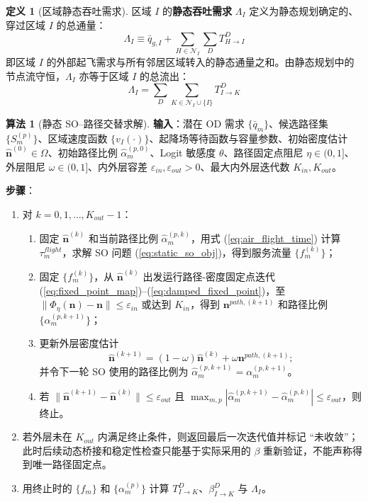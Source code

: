 \documentclass[a4paper,12pt]{article}
\theoremstyle{plain}
\theoremstyle{definition}
\newtheorem{definition}[theorem]{定义}
\newtheorem{algorithm}[theorem]{算法}
\theoremstyle{remark}
\begin{document}
\begin{definition}[区域静态吞吐需求]\label{def:lambda}
区域 $I$ 的\textbf{静态吞吐需求} $\Lambda_I$ 定义为静态规划确定的、穿过区域 $I$ 的总通量：
\begin{equation}\label{eq:lambda_def}
    \Lambda_I \equiv \bar{q}_{g,I} + \sum_{H \in \mathcal{N}_I} \sum_D T_{H \to I}^D
\end{equation}
即区域 $I$ 的外部起飞需求与所有邻居区域转入的静态通量之和。由静态规划中的节点流守恒，$\Lambda_I$ 亦等于区域 $I$ 的总流出：
\begin{equation}\label{eq:lambda_outflow}
    \Lambda_I = \sum_D \sum_{K \in \mathcal{N}_I \cup \{I\}} T_{I \to K}^D
\end{equation}
\end{definition}

\begin{algorithm}[静态 SO--路径交替求解]\label{alg:static_path_coupling}
\textbf{输入}：潜在 OD 需求 $\{\bar q_m\}$、候选路径集 $\{S_m^{(p)}\}$、区域速度函数 $\{v_I(\cdot)\}$、起降场等待函数与容量参数、初始密度估计 $\hat{\bm n}^{(0)}\in\Omega$、初始路径比例 $\widehat\alpha_m^{(p,0)}$、Logit 敏感度 $\theta$、路径固定点阻尼 $\eta\in(0,1]$、外层阻尼 $\omega\in(0,1]$、内外层容差 $\varepsilon_{in},\varepsilon_{out}>0$、最大内外层迭代数 $K_{in},K_{out}$。

\textbf{步骤}：
\begin{enumerate}
    \item 对 $k=0,1,\ldots,K_{out}-1$：
    \begin{enumerate}
        \item 固定 $\hat{\bm n}^{(k)}$ 和当前路径比例 $\widehat\alpha_m^{(p,k)}$，用式 (\ref{eq:air_flight_time}) 计算 $\tau_m^{flight}$，求解 SO 问题 (\ref{eq:static_so_obj})，得到服务流量 $\{f_m^{(k)}\}$；
        \item 固定 $\{f_m^{(k)}\}$，从 $\hat{\bm n}^{(k)}$ 出发运行路径-密度固定点迭代 (\ref{eq:fixed_point_map})--(\ref{eq:damped_fixed_point})，至 $\|\Phi_\eta(\bm n)-\bm n\|\le\varepsilon_{in}$ 或达到 $K_{in}$，得到 $\bm n^{path,(k+1)}$ 和路径比例 $\{\alpha_m^{(p,k+1)}\}$；
        \item 更新外层密度估计
        \begin{equation}
            \hat{\bm n}^{(k+1)}=(1-\omega)\hat{\bm n}^{(k)}+\omega\bm n^{path,(k+1)} ;
        \end{equation}
        并令下一轮 SO 使用的路径比例为 $\widehat\alpha_m^{(p,k+1)}=\alpha_m^{(p,k+1)}$。
        \item 若 $\|\hat{\bm n}^{(k+1)}-\hat{\bm n}^{(k)}\|\le\varepsilon_{out}$ 且 $\max_{m,p}|\widehat\alpha_m^{(p,k+1)}-\widehat\alpha_m^{(p,k)}|\le\varepsilon_{out}$，则终止。
    \end{enumerate}
    \item 若外层未在 $K_{out}$ 内满足终止条件，则返回最后一次迭代值并标记 ``未收敛''；此时后续动态桥接和稳定性检查只能基于实际采用的 $\beta$ 重新验证，不能声称得到唯一路径固定点。
    \item 用终止时的 $\{f_m\}$ 和 $\{\alpha_m^{(p)}\}$ 计算 $T_{I\to K}^D$、$\beta_{I\to K}^D$ 与 $\Lambda_I$。
\end{enumerate}


\end{algorithm}
\end{document}
